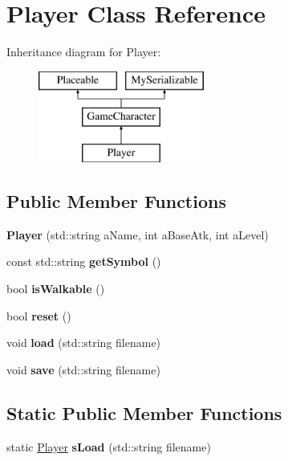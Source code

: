 \hypertarget{class_player}{}\section{Player Class Reference}
\label{class_player}
Inheritance diagram for Player\+:\begin{figure}[H]
\begin{center}
\leavevmode
\includegraphics[height=3.000000cm]{class_player}
\end{center}
\end{figure}
\subsection*{Public Member Functions}
\begin{DoxyCompactItemize}
\item 
\hypertarget{class_player_a40d8a3fff8d1bfe5646cb159acea9c16}{}\label{class_player_a40d8a3fff8d1bfe5646cb159acea9c16} 
{\bfseries Player} (std\+::string a\+Name, int a\+Base\+Atk, int a\+Level)
\item 
\hypertarget{class_player_a2998b5414ba8318f3b12e49da0fa6e8d}{}\label{class_player_a2998b5414ba8318f3b12e49da0fa6e8d} 
const std\+::string {\bfseries get\+Symbol} ()
\item 
\hypertarget{class_player_a4971158246dd9cda8ff8140440eac557}{}\label{class_player_a4971158246dd9cda8ff8140440eac557} 
bool {\bfseries is\+Walkable} ()
\item 
\hypertarget{class_player_a588612b72b0e74ba964662ce96e840f2}{}\label{class_player_a588612b72b0e74ba964662ce96e840f2} 
bool {\bfseries reset} ()
\item 
\hypertarget{class_player_ace997edd6d7632c0e28afa5efd5a2174}{}\label{class_player_ace997edd6d7632c0e28afa5efd5a2174} 
void {\bfseries load} (std\+::string filename)
\item 
\hypertarget{class_player_a4d5408ebb2f233bc2157f1e213861369}{}\label{class_player_a4d5408ebb2f233bc2157f1e213861369} 
void {\bfseries save} (std\+::string filename)
\end{DoxyCompactItemize}
\subsection*{Static Public Member Functions}
\begin{DoxyCompactItemize}
\item 
\hypertarget{class_player_ade7d529c6dd53d80e003c94a558ae6b1}{}\label{class_player_ade7d529c6dd53d80e003c94a558ae6b1} 
static \hyperlink{class_player}{Player} {\bfseries s\+Load} (std\+::string filename)
\end{DoxyCompactItemize}
